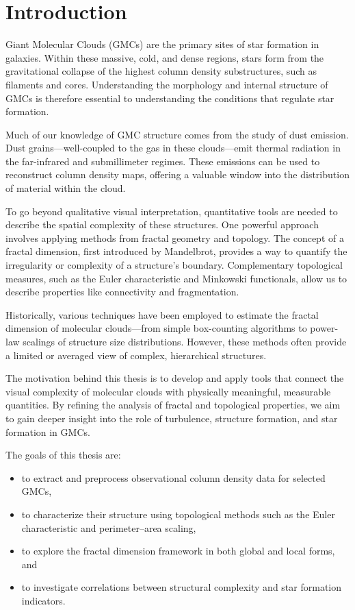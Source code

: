 \chapter{Introduction}

Giant Molecular Clouds (GMCs) are the primary sites of star formation in galaxies. Within these massive, cold, and dense regions, stars form from the gravitational collapse of the highest column density substructures, such as filaments and cores. Understanding the morphology and internal structure of GMCs is therefore essential to understanding the conditions that regulate star formation.

Much of our knowledge of GMC structure comes from the study of dust emission. Dust grains—well-coupled to the gas in these clouds—emit thermal radiation in the far-infrared and submillimeter regimes. These emissions can be used to reconstruct column density maps, offering a valuable window into the distribution of material within the cloud.

To go beyond qualitative visual interpretation, quantitative tools are needed to describe the spatial complexity of these structures. One powerful approach involves applying methods from fractal geometry and topology. The concept of a fractal dimension, first introduced by Mandelbrot, provides a way to quantify the irregularity or complexity of a structure's boundary. Complementary topological measures, such as the Euler characteristic and Minkowski functionals, allow us to describe properties like connectivity and fragmentation.

Historically, various techniques have been employed to estimate the fractal dimension of molecular clouds—from simple box-counting algorithms to power-law scalings of structure size distributions. However, these methods often provide a limited or averaged view of complex, hierarchical structures.

The motivation behind this thesis is to develop and apply tools that connect the visual complexity of molecular clouds with physically meaningful, measurable quantities. By refining the analysis of fractal and topological properties, we aim to gain deeper insight into the role of turbulence, structure formation, and star formation in GMCs.

The goals of this thesis are:
\begin{itemize}
    \item to extract and preprocess observational column density data for selected GMCs,
    \item to characterize their structure using topological methods such as the Euler characteristic and perimeter–area scaling,
    \item to explore the fractal dimension framework in both global and local forms, and
    \item to investigate correlations between structural complexity and star formation indicators.
\end{itemize}

